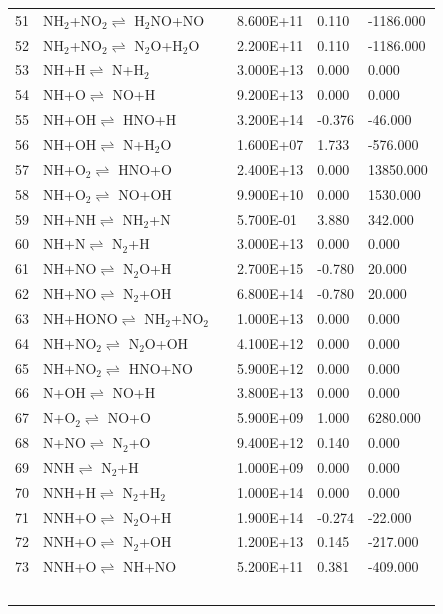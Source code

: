 \documentclass[11pt]{article}
\begin{document}
\begin{table}[hbt]
\begin{tabular}{|r l c l l l|}
51 &	NH$_{2}$+NO$_{2}$$\rightleftharpoons$ H$_{2}$NO+NO&	&	8.600E+11&	0.110&	-1186.000\\ 
52 &	NH$_{2}$+NO$_{2}$$\rightleftharpoons$ N$_{2}$O+H$_{2}$O&	&	2.200E+11&	0.110&	-1186.000\\ 
53 &	NH+H$\rightleftharpoons$ N+H$_{2}$&	&	3.000E+13&	0.000&	0.000\\ 
54 &	NH+O$\rightleftharpoons$ NO+H&	&	9.200E+13&	0.000&	0.000\\ 
55 &	NH+OH$\rightleftharpoons$ HNO+H&	&	3.200E+14&	-0.376&	-46.000\\ 
56 &	NH+OH$\rightleftharpoons$ N+H$_{2}$O&	&	1.600E+07&	1.733&	-576.000\\ 
57 &	NH+O$_{2}$$\rightleftharpoons$ HNO+O&	&	2.400E+13&	0.000&	13850.000\\ 
58 &	NH+O$_{2}$$\rightleftharpoons$ NO+OH&	&	9.900E+10&	0.000&	1530.000\\ 
59 &	NH+NH$\rightleftharpoons$ NH$_{2}$+N&	&	5.700E-01&	3.880&	342.000\\ 
60 &	NH+N$\rightleftharpoons$ N$_{2}$+H&	&	3.000E+13&	0.000&	0.000\\ 
61 &	NH+NO$\rightleftharpoons$ N$_{2}$O+H&	&	2.700E+15&	-0.780&	20.000\\ 
62 &	NH+NO$\rightleftharpoons$ N$_{2}$+OH&	&	6.800E+14&	-0.780&	20.000\\ 
63 &	NH+HONO$\rightleftharpoons$ NH$_{2}$+NO$_{2}$&	&	1.000E+13&	0.000&	0.000\\ 
64 &	NH+NO$_{2}$$\rightleftharpoons$ N$_{2}$O+OH&	&	4.100E+12&	0.000&	0.000\\ 
65 &	NH+NO$_{2}$$\rightleftharpoons$ HNO+NO&	&	5.900E+12&	0.000&	0.000\\ 
66 &	N+OH$\rightleftharpoons$ NO+H&	&	3.800E+13&	0.000&	0.000\\ 
67 &	N+O$_{2}$$\rightleftharpoons$ NO+O&	&	5.900E+09&	1.000&	6280.000\\ 
68 &	N+NO$\rightleftharpoons$ N$_{2}$+O&	&	9.400E+12&	0.140&	0.000\\ 
69 &	NNH$\rightleftharpoons$ N$_{2}$+H&	&	1.000E+09&	0.000&	0.000\\ 
70 &	NNH+H$\rightleftharpoons$ N$_{2}$+H$_{2}$&	&	1.000E+14&	0.000&	0.000\\ 
71 &	NNH+O$\rightleftharpoons$ N$_{2}$O+H&	&	1.900E+14&	-0.274&	-22.000\\ 
72 &	NNH+O$\rightleftharpoons$ N$_{2}$+OH&	&	1.200E+13&	0.145&	-217.000\\ 
73 &	NNH+O$\rightleftharpoons$ NH+NO&	&	5.200E+11&	0.381&	-409.000\\ 
$$
\end{tabular}
\end{table}
\end{document}
